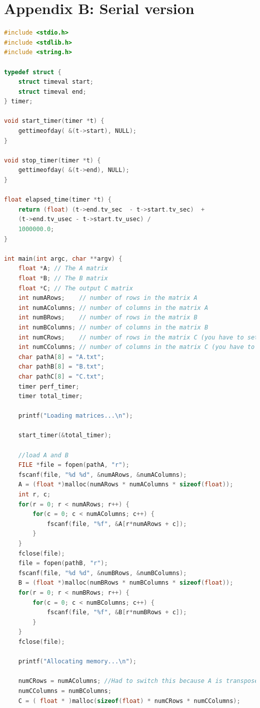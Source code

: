 \documentclass[11pt,a4paper]{article}
\begin{document}
	
	\section{Appendix B: Serial version}
	
	\begin{lstlisting}[language=c]
#include <stdio.h>
#include <stdlib.h>
#include <string.h>

typedef struct {
	struct timeval start;
	struct timeval end;
} timer;

void start_timer(timer *t) {
	gettimeofday( &(t->start), NULL);
}

void stop_timer(timer *t) {
	gettimeofday( &(t->end), NULL);
}

float elapsed_time(timer *t) {
	return (float) (t->end.tv_sec  - t->start.tv_sec)  + 
	(t->end.tv_usec - t->start.tv_usec) /
	1000000.0;
}

int main(int argc, char **argv) {
	float *A; // The A matrix
	float *B; // The B matrix
	float *C; // The output C matrix
	int numARows;    // number of rows in the matrix A
	int numAColumns; // number of columns in the matrix A
	int numBRows;    // number of rows in the matrix B
	int numBColumns; // number of columns in the matrix B
	int numCRows;    // number of rows in the matrix C (you have to set this)
	int numCColumns; // number of columns in the matrix C (you have to set this)
	char pathA[8] = "A.txt";
	char pathB[8] = "B.txt";
	char pathC[8] = "C.txt";
	timer perf_timer;
	timer total_timer;
	
	printf("Loading matrices...\n");
	
	start_timer(&total_timer);
	
	//load A and B
	FILE *file = fopen(pathA, "r");
	fscanf(file, "%d %d", &numARows, &numAColumns);
	A = (float *)malloc(numARows * numAColumns * sizeof(float));
	int r, c;
	for(r = 0; r < numARows; r++) {
		for(c = 0; c < numAColumns; c++) {
			fscanf(file, "%f", &A[r*numARows + c]);
		}
	}
	fclose(file);
	file = fopen(pathB, "r");
	fscanf(file, "%d %d", &numBRows, &numBColumns);
	B = (float *)malloc(numBRows * numBColumns * sizeof(float));
	for(r = 0; r < numBRows; r++) {
		for(c = 0; c < numBColumns; c++) {
			fscanf(file, "%f", &B[r*numBRows + c]);
		}
	}
	fclose(file);
	
	printf("Allocating memory...\n");
	
	numCRows = numAColumns; //Had to switch this because A is transposed
	numCColumns = numBColumns;
	C = ( float * )malloc(sizeof(float) * numCRows * numCColumns);
	

\end{lstlisting}
\end{document}
